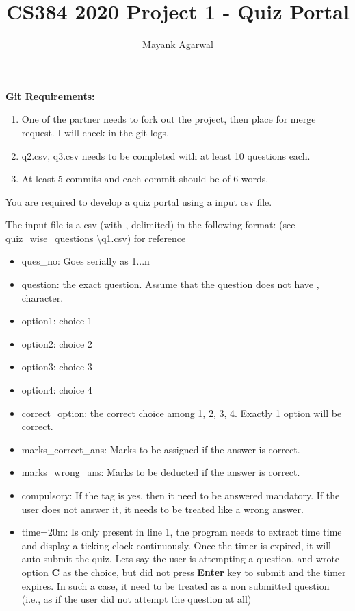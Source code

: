 \documentclass[12pt]{article}
\title{CS384 2020 Project 1 - Quiz Portal}
\author{Mayank Agarwal}
\date{}
\begin{document}
{\let\newpage\relax\maketitle} 

\textbf{Git Requirements:}

\begin{enumerate}
	\item One of the partner needs to fork out the project, then place for merge request. I will check in the git logs.
	\item q2.csv, q3.csv needs to be completed with at least 10 questions each. 
	\item At least 5 commits and each commit should be of 6 words.
\end{enumerate}

You are required to develop a quiz portal using a input csv file.

The input file is a csv (with , delimited) in the following format: (see quiz\_wise\_questions \textbackslash q1.csv) for reference

\begin{itemize}
	 \item ques\_no: Goes serially as 1...n
	\item  question: the exact question. Assume that the question does not have , character.
	\item  option1: choice 1
	\item option2:  choice 2
	\item  option3:  choice 3
	\item option4:  choice 4
	\item  correct\_option: the correct choice among 1, 2, 3, 4. Exactly 1 option will be correct.
	\item marks\_correct\_ans: Marks to be assigned if the answer is correct. 
	\item marks\_wrong\_ans: Marks to be deducted if the answer is correct. 
	\item compulsory: If the tag is yes, then it need to be answered mandatory. If the user does not answer it, it needs to be treated like a wrong answer.
	\item time=20m: Is only present in line 1, the program needs to extract time time and display a ticking clock continuously. Once the timer is expired, it will auto submit the quiz. Lets say the user is attempting a question, and wrote option \textbf{C} as the choice, but did not press \textbf{Enter} key to submit and the timer expires. In such a case, it need to be treated as a non submitted question (i.e., as if the user did not attempt the question at all)  
\end{itemize}
\end{document}

